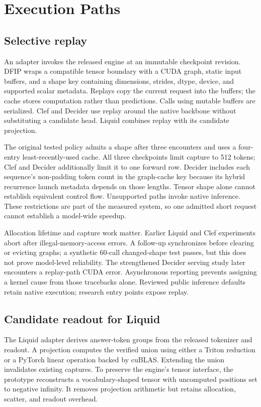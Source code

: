 \documentclass[10pt,twocolumn]{article}
\begin{document}
\section{Execution Paths}
\subsection{Selective replay}
An adapter invokes the released engine at an immutable checkpoint revision. DFIP wraps a compatible tensor boundary with a CUDA graph, static input buffers, and a shape key containing dimensions, strides, dtype, device, and supported scalar metadata. Replays copy the current request into the buffers; the cache stores computation rather than predictions. Calls using mutable buffers are serialized. Clef and Decider use replay around the native backbone without substituting a candidate head. Liquid combines replay with its candidate projection.

The original tested policy admits a shape after three encounters and uses a four-entry least-recently-used cache. All three checkpoints limit capture to 512 tokens; Clef and Decider additionally limit it to one forward row. Decider includes each sequence's non-padding token count in the graph-cache key because its hybrid recurrence launch metadata depends on those lengths. Tensor shape alone cannot establish equivalent control flow. Unsupported paths invoke native inference. These restrictions are part of the measured system, so one admitted short request cannot establish a model-wide speedup.

Allocation lifetime and capture work matter. Earlier Liquid and Clef experiments abort after illegal-memory-access errors. A follow-up synchronizes before clearing or evicting graphs; a synthetic 60-call changed-shape test passes, but this does not prove model-level reliability. The strengthened Decider serving study later encounters a replay-path CUDA error. Asynchronous reporting prevents assigning a kernel cause from those tracebacks alone. Reviewed public inference defaults retain native execution; research entry points expose replay.

\subsection{Candidate readout for Liquid}
The Liquid adapter derives answer-token groups from the released tokenizer and readout. A projection computes the verified union using either a Triton reduction or a PyTorch linear operation backed by cuBLAS. Extending the union invalidates existing captures. To preserve the engine's tensor interface, the prototype reconstructs a vocabulary-shaped tensor with uncomputed positions set to negative infinity. It removes projection arithmetic but retains allocation, scatter, and readout overhead.
\end{document}
